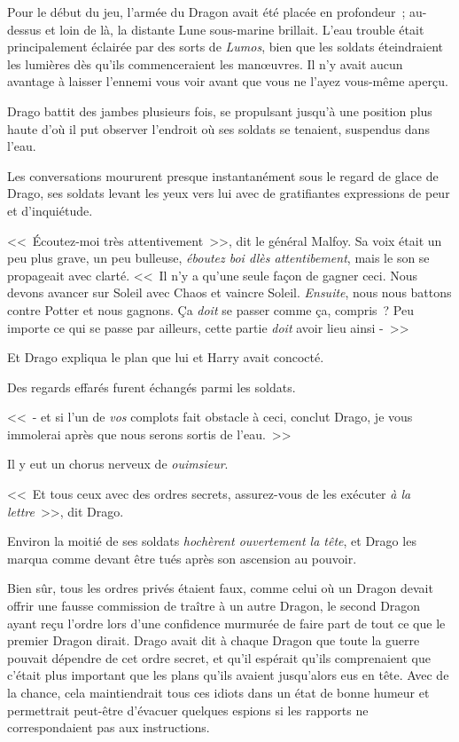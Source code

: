 Pour le début du jeu, l'armée du Dragon avait été placée en profondeur~; au-dessus et loin de là, la distante Lune sous-marine brillait. L'eau trouble était principalement éclairée par des sorts de \emph{Lumos}, bien que les soldats éteindraient les lumières dès qu'ils commenceraient les manœuvres. Il n'y avait aucun avantage à laisser l'ennemi vous voir avant que vous ne l'ayez vous-même aperçu.

Drago battit des jambes plusieurs fois, se propulsant jusqu'à une position plus haute d'où il put observer l'endroit où ses soldats se tenaient, suspendus dans l'eau.

Les conversations moururent presque instantanément sous le regard de glace de Drago, ses soldats levant les yeux vers lui avec de gratifiantes expressions de peur et d'inquiétude.

<<~Écoutez-moi très attentivement~>>, dit le général Malfoy. Sa voix était un peu plus grave, un peu bulleuse, \emph{éboutez boi dlès attentibement}, mais le son se propageait avec clarté. <<~Il n'y a qu'une seule façon de gagner ceci. Nous devons avancer sur Soleil avec Chaos et vaincre Soleil. \emph{Ensuite}, nous nous battons contre Potter et nous gagnons. Ça \emph{doit} se passer comme ça, compris~? Peu importe ce qui se passe par ailleurs, cette partie \emph{doit} avoir lieu ainsi -~>>

Et Drago expliqua le plan que lui et Harry avait concocté.

Des regards effarés furent échangés parmi les soldats.

<<~- et si l'un de \emph{vos} complots fait obstacle à ceci, conclut Drago, je vous immolerai après que nous serons sortis de l'eau.~>>

Il y eut un chorus nerveux de \emph{ouimsieur}.

<<~Et tous ceux avec des ordres secrets, assurez-vous de les exécuter \emph{à la lettre}~>>, dit Drago.

Environ la moitié de ses soldats \emph{hochèrent ouvertement la tête}, et Drago les marqua comme devant être tués après son ascension au pouvoir.

Bien sûr, tous les ordres privés étaient faux, comme celui où un Dragon devait offrir une fausse commission de traître à un autre Dragon, le second Dragon ayant reçu l'ordre lors d'une confidence murmurée de faire part de tout ce que le premier Dragon dirait. Drago avait dit à chaque Dragon que toute la guerre pouvait dépendre de cet ordre secret, et qu'il espérait qu'ils comprenaient que c'était plus important que les plans qu'ils avaient jusqu'alors eus en tête. Avec de la chance, cela maintiendrait tous ces idiots dans un état de bonne humeur et permettrait peut-être d'évacuer quelques espions si les rapports ne correspondaient pas aux instructions.

